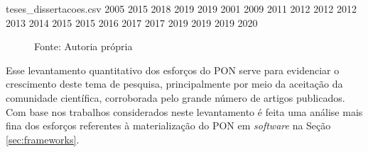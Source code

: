 \begin{filecontents}{teses_dissertacoes.csv}
  2005 2015 2018 2019 2019 2001 2009 2011 2012 2012 2012 2013 2014 2015 2015
  2016 2017 2017 2019 2019 2019 2020
\end{filecontents}

\begin{figure}[!htb]
  \begin{minipage}{.5\textwidth}
    \centering
    \caption{Gráfico com contagem de artigos publicados a cada ano}

    \caption*{Fonte: Autoria própria}
    \label{fig:graph_teses}
  \end{minipage}
  \begin{minipage}{.5\textwidth}
    \centering
    \caption{Gráfico com contagem de teses e dissertações publicadas a cada ano}
    \caption*{Fonte: Autoria própria}
    \label{fig:graph_artigos}
  \end{minipage}
\end{figure}

Esse levantamento quantitativo dos esforços do PON serve para evidenciar o
crescimento deste tema de pesquisa, principalmente por meio da aceitação da
comunidade científica, corroborada pelo grande número de artigos publicados. Com
base nos trabalhos considerados neste levantamento é feita uma análise mais fina
dos esforços referentes à materialização do PON em \textit{software} na Seção
\ref{sec:frameworks}.

